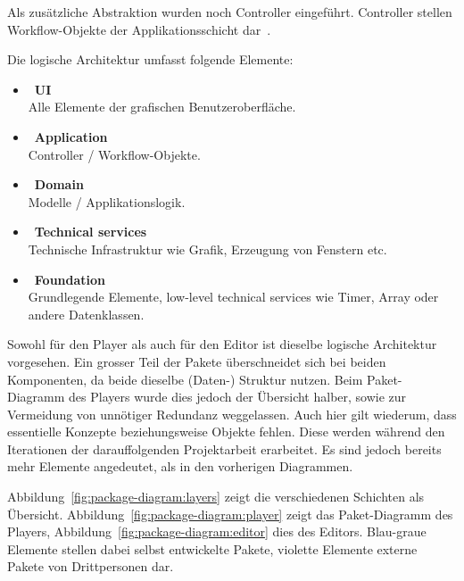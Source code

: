 Als zusätzliche Abstraktion wurden noch Controller eingeführt. Controller
stellen Workflow-Objekte der Applikationsschicht dar~\cite[S.
209]{larman_applying_2004}.

Die logische Architektur umfasst folgende Elemente:
\begin{itemize}
    \item~\textbf{UI}\\
        Alle Elemente der grafischen Benutzeroberfläche.

    \item~\textbf{Application}\\
        Controller / Workflow-Objekte.

    \item~\textbf{Domain}\\
        Modelle / Applikationslogik.

    \item~\textbf{Technical services}\\
        Technische Infrastruktur wie Grafik, Erzeugung von Fenstern etc.

    \item~\textbf{Foundation}\\
        Grundlegende Elemente, low-level technical services wie Timer, Array
        oder andere Datenklassen.
\end{itemize}

Sowohl für den Player als auch für den Editor ist dieselbe logische Architektur
vorgesehen. Ein grosser Teil der Pakete überschneidet sich bei beiden
Komponenten, da beide dieselbe (Daten-) Struktur nutzen. Beim Paket-Diagramm
des Players wurde dies jedoch der Übersicht halber, sowie zur Vermeidung von
unnötiger Redundanz weggelassen. Auch hier gilt wiederum, dass essentielle
Konzepte beziehungsweise Objekte fehlen. Diese werden während den Iterationen
der darauffolgenden Projektarbeit erarbeitet. Es sind jedoch bereits mehr
Elemente angedeutet, als in den vorherigen Diagrammen.

Abbildung~\ref{fig:package-diagram:layers} zeigt die verschiedenen Schichten
als Übersicht. Abbildung~\ref{fig:package-diagram:player} zeigt das Paket-Diagramm des
Players, Abbildung~\ref{fig:package-diagram:editor} dies des Editors.
Blau-graue Elemente stellen dabei selbst entwickelte Pakete, violette Elemente
externe Pakete von Drittpersonen dar.


